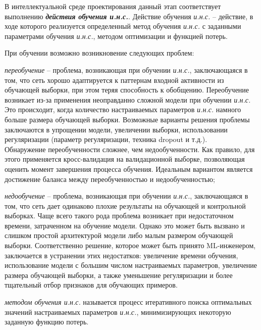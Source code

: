 В интеллектуальной среде проектирования данный этап соответствует выполнению \textbf{\textit{действия обучения и.н.с.}}. Действие обучения \textit{и.н.с.} -- действие, в ходе которого реализуется определенный метод обучения \textit{и.н.с.} с заданными параметрами обучения \textit{и.н.с.}, методом оптимизации и функцией потерь.

При обучении возможно возникновение следующих проблем:

\begin{textitemize}
	\item \textit{переобучение} -- проблема, возникающая при обучении \textit{и.н.с.}, заключающаяся в том,
	что сеть хорошо адаптируется к паттернам входной активности из обучающей выборки, при этом теряя способность к обобщению.
	Переобучение возникает из-за применения неоправданно сложной модели при обучении \textit{и.н.с.} Это происходит,
	когда количество настраиваемых параметров \textit{и.н.с.} намного больше размера обучающей выборки. Возможные
	варианты решения проблемы заключаются в упрощении модели, увеличении выборки, использовании регуляризации
	(параметр регуляризации, техника dropout и т.д.).\\
	Обнаружение переобученности сложнее, чем недообученности. Как правило, для этого применяется
	кросс-валидация на валидационной выборке, позволяющая оценить момент завершения процесса обучения.
	Идеальным вариантом является достижение баланса между переобученностью и недообученностью;

	\item \textit{недообучение} -- проблема, возникающая при обучении  \textit{и.н.с.}, заключающаяся в том,
	что сеть дает одинаково плохие результаты на обучающей и контрольной выборках.
	Чаще всего такого рода проблема возникает при недостаточном времени, затраченном на обучение модели.
	Однако это может быть вызвано и слишком простой архитектурой модели либо малым размером обучающей
	выборки. Соответственно решение, которое может быть принято ML-инженером, заключается в устранении
	этих недостатков: увеличение времени обучения, использование модели с большим числом настраиваемых
	параметров, увеличение размера обучающей выборки, а также уменьшение регуляризации и более тщательный
	отбор признаков для обучающих примеров.
\end{textitemize}

\textit{методом обучения \textit{и.н.с.}} называется процесс итеративного поиска оптимальных значений настраиваемых параметров \textit{и.н.с.}, минимизирующих некоторую заданную функцию потерь.


